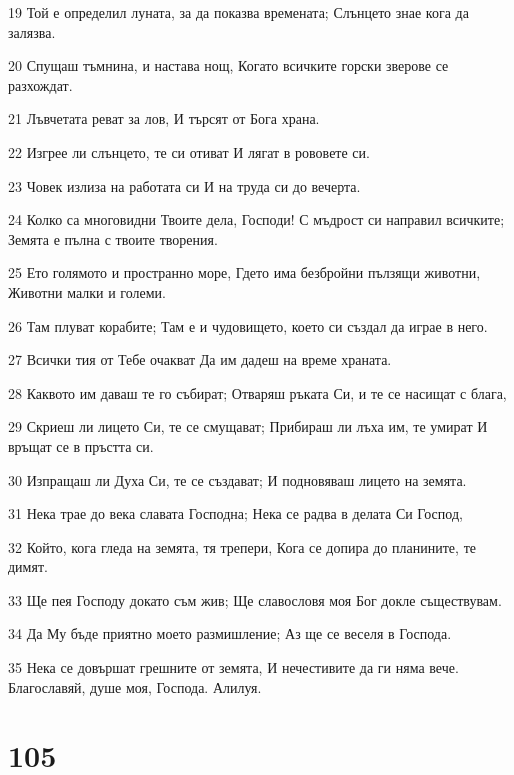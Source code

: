 \par 19 Той е определил луната, за да показва времената; Слънцето знае кога да залязва.
\par 20 Спущаш тъмнина, и настава нощ, Когато всичките горски зверове се разхождат.
\par 21 Лъвчетата реват за лов, И търсят от Бога храна.
\par 22 Изгрее ли слънцето, те си отиват И лягат в рововете си.
\par 23 Човек излиза на работата си И на труда си до вечерта.
\par 24 Колко са многовидни Твоите дела, Господи! С мъдрост си направил всичките; Земята е пълна с твоите творения.
\par 25 Ето голямото и пространно море, Гдето има безбройни пълзящи животни, Животни малки и големи.
\par 26 Там плуват корабите; Там е и чудовището, което си създал да играе в него.
\par 27 Всички тия от Тебе очакват Да им дадеш на време храната.
\par 28 Каквото им даваш те го събират; Отваряш ръката Си, и те се насищат с блага,
\par 29 Скриеш ли лицето Си, те се смущават; Прибираш ли лъха им, те умират И връщат се в пръстта си.
\par 30 Изпращаш ли Духа Си, те се създават; И подновяваш лицето на земята.
\par 31 Нека трае до века славата Господна; Нека се радва в делата Си Господ,
\par 32 Който, кога гледа на земята, тя трепери, Кога се допира до планините, те димят.
\par 33 Ще пея Господу докато съм жив; Ще славословя моя Бог докле съществувам.
\par 34 Да Му бъде приятно моето размишление; Аз ще се веселя в Господа.
\par 35 Нека се довършат грешните от земята, И нечестивите да ги няма вече. Благославяй, душе моя, Господа. Алилуя.

\chapter{105}

